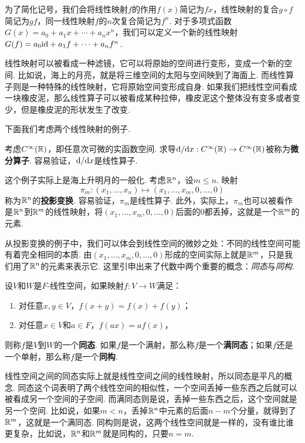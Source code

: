 为了简化记号，我们会将线性映射$f$的作用$f(x)$简记为$fx$，线性映射的复合$g\circ f$简记为$gf$，同一线性映射$f$的$n$次复合简记为$f^n$. 对于多项式函数$G(x)=a_0+a_1x+\cdots+a_nx^n$，我们可以定义一个新的线性映射$G(f)=a_0\mathrm{id}+a_1f+\cdots+a_nf^n$. 

线性映射可以被看成一种滤镜，它可以将原始的空间进行变形，变成一个新的空间. 比如说，海上的月亮，就是将三维空间的太阳与空间映到了海面上. 而线性算子则是一种特殊的线性映射，它将原始空间变形成自身. 如果我们把线性空间看成一块橡皮泥，那么线性算子可以被看成某种拉伸，橡皮泥这个整体没有变多或者变少，但是橡皮泥的形状发生了改变. 

下面我们考虑两个线性映射的例子. 

\begin{example}[微分算子]
考虑$C^\infty(\mathbb{R})$，即任意次可微的实函数空间. 求导$\mathrm{d}/\mathrm{d} x:C^\infty(\mathbb{R})\to C^\infty(\mathbb{R})$被称为\textbf{微分算子}. 容易验证，$\mathrm{d}/\mathrm{d} x$是线性算子. 
\end{example}

\begin{example}[投影变换]
这个例子实际上是海上升明月的一般化. 考虑$\mathbb{R}^n$，设$m\leq n$. 映射
\[\pi_m:(x_1,\dots,x_n)\mapsto (x_1,\dots,x_m,0,\dots,0)\]
称为$\mathbb{R}^n$的\textbf{投影变换}. 容易验证，$\pi_m$是线性算子. 此外，实际上，$\pi_m$也可以被看作是$\mathbb{R}^n$到$\mathbb{R}^m$的线性映射，将$(x_1,\dots,x_m,0,\dots,0)$后面的$0$都丢掉，这就是一个$\mathbb{R}^m$的元素. 
\end{example}

从投影变换的例子中，我们可以体会到线性空间的微妙之处：不同的线性空间可能有着完全相同的本质. 由$(x_1,\dots,x_m,0,\dots,0)$形成的空间实际上就是$\mathbb{R}^m$，只是我们用了$\mathbb{R}^n$的元素来表示它. 这里引申出来了代数中两个重要的概念：\emph{同态}与\emph{同构}. 

\begin{definition}[同态与同构]
设$V$和$W$是$F$-线性空间，如果映射$f:V\to W$满足：
\begin{enumerate}
    \item 对任意$x,y\in V$，$f(x+y)=f(x)+f(y)$；
    \item 对任意$x\in V$和$a\in F$，$f(ax)=af(x)$，
\end{enumerate}
则称$f$是$V$到$W$的一个\textbf{同态}. 如果$f$是一个满射，那么称$f$是一个\textbf{满同态}；如果$f$还是一个单射，那么称$f$是一个\textbf{同构}. 
\end{definition}

线性空间之间的同态实际上就是线性空间之间的线性映射，所以同态是平凡的概念. 同态这个词表明了两个线性空间的相似性，一个空间丢掉一些东西之后就可以被看成另一个空间的子空间. 而满同态则是说，丢掉一些东西之后，这个空间就是另一个空间. 比如说，如果$m<n$，丢掉$\mathbb{R}^n$中元素的后面$n-m$个分量，就得到了$\mathbb{R}^m$，这就是一个满同态. 同构则是说，这两个线性空间就是一样的，没有谁比谁更复杂，比如说，$\mathbb{R}^n$和$\mathbb{R}^m$就是同构的，只要$n=m$. 

